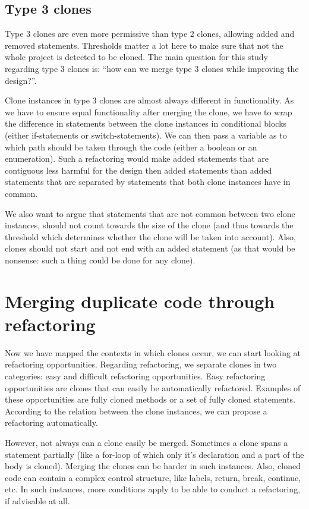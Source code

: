 \documentclass[a4paper]{article}
\begin{document}
\subsection{Type 3 clones}
Type 3 clones are even more permissive than type 2 clones, allowing added and removed statements. Thresholds matter a lot here to make sure that not the whole project is detected to be cloned. The main question for this study regarding type 3 clones is: ``how can we merge type 3 clones while improving the design?''.

Clone instances in type 3 clones are almost always different in functionality. As we have to ensure equal functionality after merging the clone, we have to wrap the difference in statements between the clone instances in conditional blocks (either if-statements or switch-statements). We can then pass a variable as to which path should be taken through the code (either a boolean or an enumeration). Such a refactoring would make added statements that are contiguous less harmful for the design then added statements than added statements that are separated by statements that both clone instances have in common.

We also want to argue that statements that are not common between two clone instances, should not count towards the size of the clone (and thus towards the threshold which determines whether the clone will be taken into account). Also, clones should not start and not end with an added statement (as that would be nonsense: such a thing could be done for any clone).

\section{Merging duplicate code through refactoring}
Now we have mapped the contexts in which clones occur, we can start looking at refactoring opportunities. Regarding refactoring, we separate clones in two categories: easy and difficult refactoring opportunities. Easy refactoring opportunities are clones that can easily be automatically refactored. Examples of these opportunities are fully cloned methods or a set of fully cloned statements. According to the relation between the clone instances, we can propose a refactoring automatically.

However, not always can a clone easily be merged. Sometimes a clone spans a statement partially (like a for-loop of which only it's declaration and a part of the body is cloned). Merging the clones can be harder in such instances. Also, cloned code can contain a complex control structure, like labels, return, break, continue, etc. In such instances, more conditions apply to be able to conduct a refactoring, if advisable at all.
\end{document}
